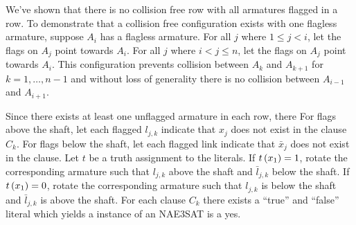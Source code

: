 \begin{pf}
\begin{enumerate}
We've shown that there is no collision free row with all armatures flagged in a row.  
To demonstrate that a collision free configuration exists with one flagless armature, suppose $A_i$ 
has a flagless armature.  For all $j$ where $ 1 \leq j < i$, let the flags on $A_j$ point towards 
$A_i$. For all $j$ where $ i < j \leq n$, let the flags on $A_j$ point towards 
$A_i$.  This configuration prevents collision between $A_k$ and $A_{k+1}$ for $k = 1,\dots,n-1$ and 
without loss of generality there is no collision between $A_{i-1}$ and $A_{i+1}$.
\end{enumerate}
Since there exists at least one unflagged armature in each row, there 
For flags above the shaft, let each flagged $l_{j,k}$ 
indicate that $x_j$ does not exist in the clause $C_k$.  For flags below the shaft, let each 
flagged link indicate that $\bar{x}_j$ does not exist in the clause.  Let 
$t$ be a truth assignment to the literals.  If $t \left( x_1 \right) = 1$, rotate the corresponding armature 
such that $l_{j,k}$ above the shaft and $\bar{l}_{j,k}$ below the shaft.  If $t \left( x_1 \right) = 0$, 
rotate the corresponding armature such that $l_{j,k}$ is below the shaft and $\bar{l}_{j,k}$ is 
above the shaft.  For each clause $C_k$ there exists a ``true'' and ``false'' literal which yields 
a instance of an NAE3SAT is a yes.
\end{pf}
